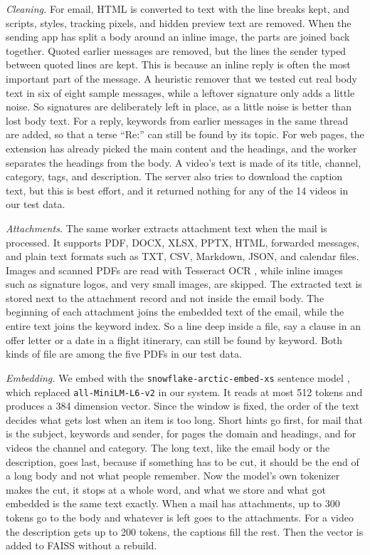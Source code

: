 \documentclass[conference]{IEEEtran}
\newcommand{\embmodel}{\texttt{snowflake\allowbreak-arctic\allowbreak-embed\allowbreak-xs}}
\begin{document}
\textit{Cleaning.} For email, HTML is converted to text with the line breaks kept, and scripts, styles, tracking pixels, and hidden preview text are removed. When the sending app has split a body around an inline image, the parts are joined back together. Quoted earlier messages are removed, but the lines the sender typed between quoted lines are kept. This is because an inline reply is often the most important part of the message. A heuristic remover that we tested cut real body text in six of eight sample messages, while a leftover signature only adds a little noise. So signatures are deliberately left in place, as a little noise is better than lost body text. For a reply, keywords from earlier messages in the same thread are added, so that a terse ``Re:'' can still be found by its topic. For web pages, the extension has already picked the main content and the headings, and the worker separates the headings from the body. A video's text is made of its title, channel, category, tags, and description. The server also tries to download the caption text, but this is best effort, and it returned nothing for any of the 14 videos in our test data.

\textit{Attachments.} The same worker extracts attachment text when the mail is processed. It supports PDF, DOCX, XLSX, PPTX, HTML, forwarded messages, and plain text formats such as TXT, CSV, Markdown, JSON, and calendar files. Images and scanned PDFs are read with Tesseract OCR \cite{b15}, while inline images such as signature logos, and very small images, are skipped. The extracted text is stored next to the attachment record and not inside the email body. The beginning of each attachment joins the embedded text of the email, while the entire text joins the keyword index. So a line deep inside a file, say a clause in an offer letter or a date in a flight itinerary, can still be found by keyword. Both kinds of file are among the five PDFs in our test data.

\textit{Embedding.} We embed with the \embmodel{} sentence model \cite{b16}, which replaced \texttt{all-\allowbreak MiniLM-\allowbreak L6-\allowbreak v2} in our system. It reads at most 512 tokens and produces a 384 dimension vector. Since the window is fixed, the order of the text decides what gets lost when an item is too long. Short hints go first, for mail that is the subject, keywords and sender, for pages the domain and headings, and for videos the channel and category. The long text, like the email body or the description, goes last, because if something has to be cut, it should be the end of a long body and not what people remember. Now the model's own tokenizer makes the cut, it stops at a whole word, and what we store and what got embedded is the same text exactly. When a mail has attachments, up to 300 tokens go to the body and whatever is left goes to the attachments. For a video the description gets up to 200 tokens, the captions fill the rest. Then the vector is added to FAISS without a rebuild.
\end{document}
